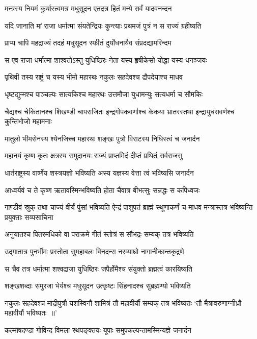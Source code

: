 \twolineshloka
{मन्त्रस्य नियमं कुर्यास्त्वमत्र मधुसूदन}
{एतदत्र हितं मन्ये सर्वं यादवनन्दन}


\twolineshloka
{यदि जानाति मां राजा धर्मात्मा संयतेन्द्रियः}
{कुन्त्याः प्रथमजं पुत्रं न स राज्यं ग्रहीष्यति}


\twolineshloka
{प्राप्य चापि महद्राज्यं तदहं मधुसूदन}
{स्फीतं दुर्योधनायैव संप्रदद्यामरिन्दम}


\twolineshloka
{स एव राजा धर्मात्मा शाश्वतोऽस्तु युधिष्ठिरः}
{नेता यस्य हृषीकेसो योद्धा यस्य धनञ्जयः}


\twolineshloka
{पृथिवी तस्य राष्ट्रं च यस्य भीमो महारथः}
{नकुलः सहदेवश्च द्रौपदेयाश्च माधव}


\twolineshloka
{धृष्टद्युन्मश्च पाञ्चल्यः सात्यकिश्च महारथः}
{उत्तमौजा युधामन्युः सत्यधर्मा च सौमकिः}


\threelineshloka
{चैद्यश्च चेकितानश्च शिखण्डी चापराजितः}
{इन्द्रगोपकवर्णाश्च केकया भ्रातरस्तथा}
{इन्द्रायुधसवर्णश्च कुन्तिभोजो महामनाः}


\twolineshloka
{मातुलो भीमसेनस्य श्येनजिच्च महारथः}
{शङ्खः पुत्रो विराटस्य निधिस्त्वं च जनार्दन}


\twolineshloka
{महानयं कृष्ण कृतः क्षत्रस्य समुदानयः}
{राज्यं प्राप्तमिदं दीप्तं प्रथितं सर्वराजसु}


\twolineshloka
{धार्तराष्ट्रस्य वार्ष्णेय शस्त्रयज्ञो भविष्यति}
{अस्य यज्ञस्य वेत्ता त्वं भविष्यसि जनार्दन}


\twolineshloka
{आध्वर्यवं च ते कृष्ण ऋतावस्मिन्भविष्यति}
{होता चैवात्र बीभत्सुः सन्नद्धः स कपिध्वजः}


\threelineshloka
{गाण्डीवं स्रुक् तथा चाज्यं वीर्यं पुंसां भविष्यति}
{ऐन्द्रं पाशुपतं ब्राह्मं स्थूणाकर्णं च माधव}
{मन्त्रास्तत्र भविष्यन्ति प्रयुक्ताः सव्यसाचिना}


\twolineshloka
{अनुयातश्च पितरमधिको वा पराक्रमे}
{गीतं स्तोत्रं स सौभद्रः सम्यक् तत्र भविष्यति}


\twolineshloka
{उद्गातात्र पुनर्भीमः प्रस्तोता सुमहाबलः}
{विनदन्स नरव्याघ्रो नागानीकान्तकृद्रणे}


\twolineshloka
{स चैव तत्र धर्मात्मा शश्वद्राजा युधिष्ठिरः}
{जपैर्होमैश्च संयुक्तो ब्रह्मत्वं कारयिष्यति}


\twolineshloka
{शङ्खशब्दाः समुरजा भेर्यश्च मधुसूदन}
{उत्कृष्टः सिंहनादश्च सुब्रह्मण्यो भविष्यति}


\threelineshloka
{नकुलः सहदेवश्च माद्रीपुत्रौ यशस्विनौ}
{शामित्रं तौ महावीर्यौ सम्यक् तत्र भविष्यतः}
{`तौ मैत्रावरुणाग्नीध्रौ महावीर्यौ भविष्यतः ॥'}


\twolineshloka
{कल्माषदण्डा गोविन्द विमला रथपङ्क्तयः}
{यूपाः समुपकल्पन्तामस्मिन्यज्ञे जनार्दन}



